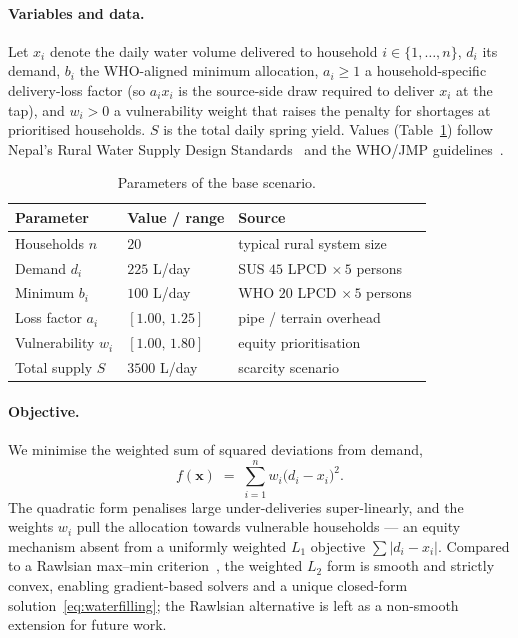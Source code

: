 \paragraph{Variables and data.}
Let $x_i$ denote the daily water volume delivered to household
$i \in \{1,\dots,n\}$, $d_i$ its demand, $b_i$ the WHO-aligned
minimum allocation, $a_i \geq 1$ a household-specific
delivery-loss factor (so $a_i x_i$ is the source-side draw
required to deliver $x_i$ at the tap), and $w_i > 0$ a
vulnerability weight that raises the penalty for shortages at
prioritised households. $S$ is the total daily spring yield.
Values (Table~\ref{tab:params}) follow Nepal's Rural Water
Supply Design Standards~\citep{nepalDWSS} and the WHO/JMP
guidelines~\citep{whoJMP}.

\begin{table}[H]
\centering
\small
\caption{Parameters of the base scenario.}
\label{tab:params}
\begin{tabular}{@{}lll@{}}
\toprule
Parameter & Value / range & Source \\ \midrule
Households $n$         & $20$                 & typical rural system size \\
Demand $d_i$           & $225$ \si{L/day}     & SUS $45$ LPCD $\times\, 5$ persons~\citep{nepalDWSS} \\
Minimum $b_i$          & $100$ \si{L/day}     & WHO $20$ LPCD $\times\, 5$ persons~\citep{whoJMP} \\
Loss factor $a_i$      & $[1.00,\, 1.25]$     & pipe / terrain overhead \\
Vulnerability $w_i$    & $[1.00,\, 1.80]$     & equity prioritisation \\
Total supply $S$       & $3500$ \si{L/day}    & scarcity scenario~\citep{gautam2020} \\
\bottomrule
\end{tabular}
\end{table}

\paragraph{Objective.}
We minimise the weighted sum of squared deviations from demand,
\begin{equation}
  f(\mathbf{x}) \;=\; \sum_{i=1}^{n} w_i\bigl(d_i - x_i\bigr)^{2}.
  \label{eq:obj}
\end{equation}
The quadratic form penalises large under-deliveries
super-linearly, and the weights $w_i$ pull the allocation towards
vulnerable households --- an equity mechanism absent from a
uniformly weighted $L_1$ objective $\sum|d_i - x_i|$.
Compared to a Rawlsian max--min criterion~\citep{rawls1971},
the weighted $L_2$ form is smooth and strictly convex,
enabling gradient-based solvers and a unique closed-form
solution~\eqref{eq:waterfilling}; the Rawlsian alternative
is left as a non-smooth extension for future work.

